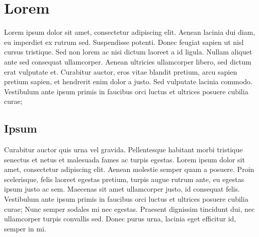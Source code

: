 \section{Lorem}
Lorem ipsum dolor sit amet, consectetur adipiscing elit. Aenean lacinia dui diam, eu imperdiet ex rutrum sed. Suspendisse potenti. Donec feugiat sapien ut nisl cursus tristique. Sed non lorem ac nisi dictum laoreet a id ligula. Nullam aliquet ante sed consequat ullamcorper. Aenean ultricies ullamcorper libero, sed dictum erat vulputate et. Curabitur auctor, eros vitae blandit pretium, arcu sapien pretium sapien, et hendrerit enim dolor a justo. Sed vulputate lacinia commodo. Vestibulum ante ipsum primis in faucibus orci luctus et ultrices posuere cubilia curae;

\subsection{Ipsum}
Curabitur auctor quis urna vel gravida. Pellentesque habitant morbi tristique senectus et netus et malesuada fames ac turpis egestas. Lorem ipsum dolor sit amet, consectetur adipiscing elit. Aenean molestie semper quam a posuere. Proin scelerisque, felis laoreet egestas pretium, turpis augue rutrum ante, eu egestas ipsum justo ac sem. Maecenas sit amet ullamcorper justo, id consequat felis. Vestibulum ante ipsum primis in faucibus orci luctus et ultrices posuere cubilia curae; Nunc semper sodales mi nec egestas. Praesent dignissim tincidunt dui, nec ullamcorper turpis convallis sed. Donec purus urna, lacinia eget efficitur id, semper in mi.


